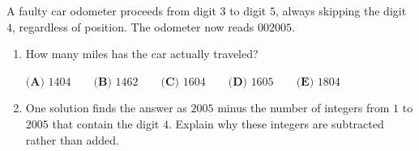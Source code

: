 A faulty car odometer proceeds from digit $3$ to digit $5$, always skipping the digit $4$, regardless of position. The odometer now reads $002005$.
\begin{enumerate}
\item[(a)] How many miles has the car actually traveled?

$\textbf{(A) } 1404 \qquad \textbf{(B) } 1462 \qquad \textbf{(C) } 1604 \qquad \textbf{(D) } 1605 \qquad \textbf{(E) } 1804$
\item[(b)] One solution finds the answer as $2005$ minus the number of integers from $1$ to $2005$ that contain the digit $4$. Explain why these integers are subtracted rather than added.
\end{enumerate}
